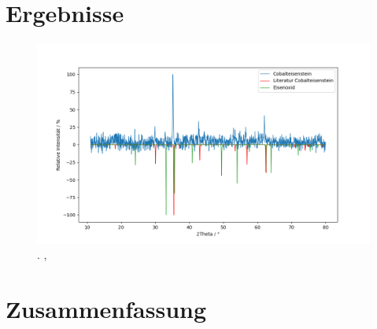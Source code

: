 \documentclass[a4paper,12pt,bibliography=totocnumbered]{scrartcl}
\begin{document}
\section{Ergebnisse}
\begin{figure}[H]
    \centering
    \includegraphics[scale=0.7]{Bilder/messreihen.png}
    \caption{. \cite{Rieck}, \cite{FeDiff}}
    \label{fig: prettyplot}
\end{figure}





\section{Zusammenfassung}




\printbibliography[title={Literatur}]
\end{document}
